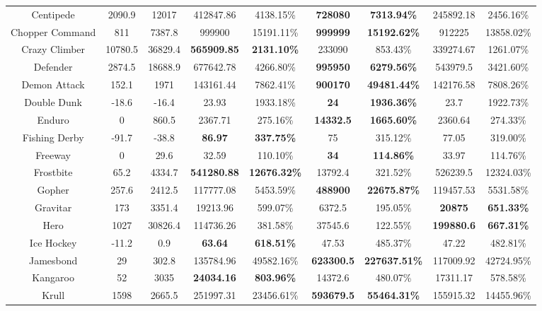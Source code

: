 \begin{table}[!hb]
\begin{center}
\begin{tabular}{c c c c c c c cc}
        Centipede & 2090.9 & 12017 & 412847.86 & 4138.15\% & \textbf{728080} & \textbf{7313.94\%} & 245892.18 & 2456.16\%\\  
        Chopper Command & 811 & 7387.8 & 999900 & 15191.11\% & \textbf{999999} & \textbf{15192.62\%} & 912225	&13858.02\%\\  
        Crazy Climber & 10780.5 & 36829.4 & \textbf{565909.85} & \textbf{2131.10\%} & 233090 & 853.43\% & 339274.67	& 1261.07\%\\  
        Defender & 2874.5 & 18688.9 & 677642.78 & 4266.80\% & \textbf{995950} & \textbf{6279.56\%} & 543979.5	& 3421.60\%\\  
        Demon Attack & 152.1 & 1971 & 143161.44 & 7862.41\% & \textbf{900170} & \textbf{49481.44\%} & 142176.58	& 7808.26\%\\  
        Double Dunk & -18.6 & -16.4 & 23.93 & 1933.18\% & \textbf{24} & \textbf{1936.36\%} & 23.7	&1922.73\%\\  
        Enduro & 0 & 860.5 & 2367.71 & 275.16\% & \textbf{14332.5} & \textbf{1665.60\%} & 2360.64	&274.33\%\\  
        Fishing Derby & -91.7 & -38.8 & \textbf{86.97} & \textbf{337.75\%} & 75 & 315.12\% & 77.05	&319.00\%\\  
        Freeway & 0 & 29.6 & 32.59 & 110.10\% & \textbf{34} & \textbf{114.86\%} & 33.97	& 114.76\%\\  
        Frostbite & 65.2 & 4334.7 & \textbf{541280.88} & \textbf{12676.32\%} & 13792.4 & 321.52\% & 526239.5	& 12324.03\%\\  
        Gopher & 257.6 & 2412.5 & 117777.08 & 5453.59\% & \textbf{488900} & \textbf{22675.87\%} & 119457.53	& 5531.58\%\\  
        Gravitar & 173 & 3351.4 & 19213.96 & 599.07\% & 6372.5 & 195.05\% & \textbf{20875}	& \textbf{651.33\%}\\  
        Hero & 1027 & 30826.4 & 114736.26 & 381.58\% & 37545.6 & 122.55\% & \textbf{199880.6}	& \textbf{667.31\%}\\  
        Ice Hockey & -11.2 & 0.9 & \textbf{63.64} & \textbf{618.51\%} & 47.53 & 485.37\% & 47.22	& 482.81\%\\  
        Jamesbond & 29 & 302.8 & 135784.96 & 49582.16\% & \textbf{623300.5} & \textbf{227637.51\%} & 117009.92	&42724.95\%\\  
        Kangaroo & 52 & 3035 & \textbf{24034.16} & \textbf{803.96\%} & 14372.6 & 480.07\% & 17311.17 & 578.58\%\\  
        Krull & 1598 & 2665.5 & 251997.31 & 23456.61\% & \textbf{593679.5} & \textbf{55464.31\%} & 155915.32 & 14455.96\%\\  

\end{tabular}
\end{center}
\end{table}
